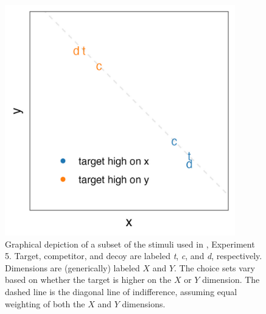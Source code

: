 \begin{figure}
    \centering
    \includegraphics[width=100mm]{figures/banerjee_stim.jpeg}
    \caption{Graphical depiction of a subset of the stimuli used in \textcite{banerjeeFactorsThatPromote2024}, Experiment 5. Target, competitor, and decoy are labeled \textit{t}, \textit{c}, and \textit{d}, respectively. Dimensions are (generically) labeled $X$ and $Y$. The choice sets vary based on whether the target is higher on the $X$ or $Y$ dimension. The dashed line is the diagonal line of indifference, assuming equal weighting of both the $X$ and $Y$ dimensions.}
    \label{fig:banerjee_stim}
\end{figure}

